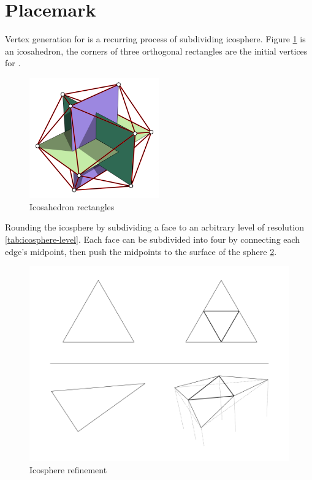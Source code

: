 \section{Placemark}

Vertex generation for  is a recurring process of subdividing icosphere. Figure \ref{fig:icosahedron-rectangles} is an icosahedron, the corners of three orthogonal rectangles are the initial vertices for .

\begin{figure}[H]
\caption[Icosahedron rectangles]{Icosahedron rectangles \cite{wiki.icosahedron-rectangles.2006}}
\label{fig:icosahedron-rectangles}
\centering
\includegraphics[width=0.5\textwidth, keepaspectratio]{Figures/icosahedron-rectangles.png}
\decoRule
\end{figure}

Rounding the icosphere by subdividing a face to an arbitrary level of resolution \ref{tab:icosphere-level}. Each face can be subdivided into four by connecting each edge's midpoint, then push the midpoints to the surface of the sphere \ref{fig:icosphere-refinement}.

\begin{figure}[H]
\caption{Icosphere refinement}
\label{fig:icosphere-refinement}
\centering
\includegraphics[width=\textwidth, keepaspectratio]{Figures/icosphere-refinement.png}
\decoRule
\end{figure}


